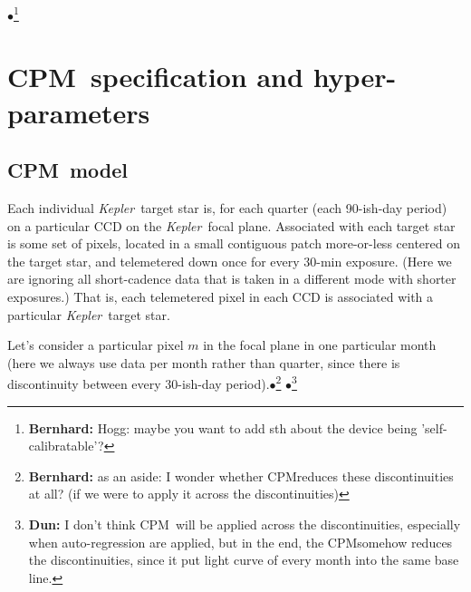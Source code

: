 \documentclass[12pt, preprint]{aastex}
\newcommand{\project}[1]{\textsl{#1}}
\newcommand{\Kepler}{\project{Kepler}}
\newcommand{\name}{CPM}
\newcommand{\Bernhard}[1]{$\bullet$\footnote{{\bf Bernhard:} #1}}
\newcommand{\Dun}[1]{$\bullet$\footnote{{\bf Dun:} #1}}
\begin{document}
\Bernhard{Hogg: maybe you want to add sth about the device being 'self-calibratable'?}

\section{\name\ specification and hyper-parameters}
\subsection{\name\ model}
Each individual \Kepler\ target star is, for each quarter (each 90-ish-day period)
  on a particular CCD on the \Kepler\ focal plane.
Associated with each target star is some set of pixels,
  located in a small contiguous patch more-or-less centered on the target star,
  and telemetered down once for every 30-min exposure.
(Here we are ignoring all short-cadence data that is taken in a different mode with shorter exposures.)
That is, each telemetered pixel in each CCD is associated with a particular \Kepler\ target star.

Let's consider a particular pixel $m$ in the focal plane in one particular month
(here we always use data per month rather than quarter,  
since there is discontinuity between every 30-ish-day period).\Bernhard{as an aside: I wonder whether \name reduces these discontinuities at all? (if we were to apply it across the discontinuities)}
\Dun{I don't think \name\ will be applied across the discontinuities, especially when auto-regression are applied,  but in the end,  the \name somehow reduces the discontinuities, since it put light curve of every month into the same base line.}
\end{document}
